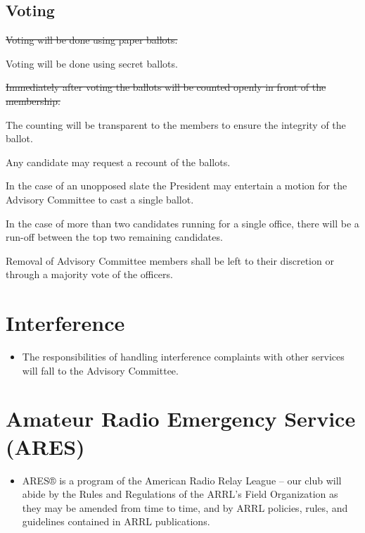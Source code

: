 \documentclass{article}
\begin{document}
\subsection{Voting}
\begin{itemize}
{\color{red} \item  \sout{Voting will be done using paper ballots.}}
{\color{blue} \item Voting will be done using secret ballots.}

{\color{red} \item \sout{Immediately after voting the ballots will be counted openly in front of the membership.}}

{\color{blue} \item The counting will be transparent to the members to ensure the integrity of the ballot.}

\item Any candidate may request a recount of the ballots.

\item In the case of an unopposed slate the President may entertain a motion for the Advisory Committee to cast a single ballot.

\item In the case of more than two candidates running for a single office, there will be a run-off between the top two remaining candidates.  

\item Removal of Advisory Committee members shall be left to their discretion or through a majority vote of the officers.
\end{itemize}

\section{Interference}
\begin{itemize}
\item The responsibilities of handling interference complaints with other services will fall to the Advisory Committee.
\end{itemize}

\section{Amateur Radio Emergency Service (ARES)}
\begin{itemize}
\item ARES® is a program of the American Radio Relay League -- our club will abide by the Rules and Regulations of the ARRL’s Field Organization as they may be amended from time to time, and by ARRL policies, rules, and guidelines contained in ARRL publications.
\end{itemize}
\end{document}
